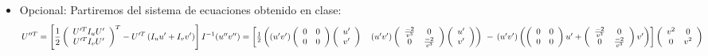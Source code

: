 \documentclass[12pt,a4paper]{article}
\begin{document}
\begin{enumerate}
\begin{center}
  \end{center}
  \begin{itemize}
     \item Opcional:
       Partiremos del sistema de ecuaciones obtenido en clase:
       \begin{equation*}
           U''^{T} = \left[ \frac{1}{2}
             \left( 
               \begin{array}{c}
                 U'^{T}I_{u}U' \\
                 U'^{T}I_{v}U'
               \end{array}\right)^{T}-U'^{T}\left(I_{u}u'+I_{v}v'\right)\right]I^{-1} $$\\ \\
           $$\left(u'' v''\right) = \left[ \frac{1}{2}
             \left(
               \left(u' v'\right)
               \left(
                 \begin{array}{cc}
                   0 & 0 \\ 
                   0 & 0 
                 \end{array}\right)
               \left(
                 \begin{array} {c}
                   u' \\
                   v' 
                 \end{array}\right)\ \ \ \left(u' v'\right)
               \left(
                 \begin{array} {cc}
                   \frac{-2}{v^{3}} & 0 \\ 
                   0 &  \frac{-2}{v^{3}} 
                 \end{array}\right)
               \left(
                 \begin{array}{c}
                   u' \\ 
                   v' 
                 \end{array} \right) \right)
             \ - \\ \\ \\
             \left(u' v'\right)
             \left(
               \left(
                 \begin{array}{cc}
                   0 & 0 \\ 
                   0 & 0 
                 \end{array}\right)u'
               +
               \left(
                 \begin{array}{cc}
                   \frac{-2}{v^{3}} & 0 \\ 
                   0 & \frac{-2}{v^{3}} 
                 \end{array}\right)v'\right)\right]
           \left(
             \begin{array}{cc} 
               v^{2} & 0 \\ 
               0 & v^{2} 
             \end{array}\right)
       \end{equation*}
       

\end{itemize}
\end{enumerate}
\end{document}
